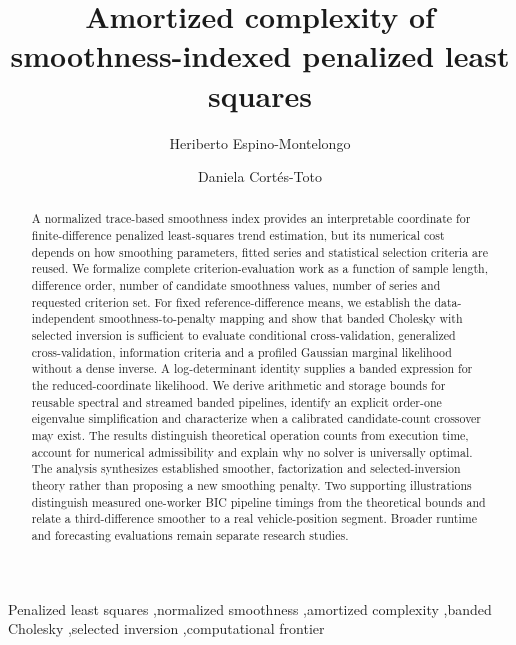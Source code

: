 \documentclass[a4paper,fleqn]{cas-dc}
\begin{document}
\let\WriteBookmarks\relax
\def\floatpagepagefraction{1}
\def\textpagefraction{.001}
\title[mode=title]{Amortized complexity of smoothness-indexed penalized least squares}
\author[1]{Heriberto Espino-Montelongo}
\author[1]{Daniela Cort\'es-Toto}
\begin{abstract}
A normalized trace-based smoothness index provides an interpretable coordinate for finite-difference penalized least-squares trend estimation, but its numerical cost depends on how smoothing parameters, fitted series and statistical selection criteria are reused. We formalize complete criterion-evaluation work as a function of sample length, difference order, number of candidate smoothness values, number of series and requested criterion set. For fixed reference-difference means, we establish the data-independent smoothness-to-penalty mapping and show that banded Cholesky with selected inversion is sufficient to evaluate conditional cross-validation, generalized cross-validation, information criteria and a profiled Gaussian marginal likelihood without a dense inverse. A log-determinant identity supplies a banded expression for the reduced-coordinate likelihood. We derive arithmetic and storage bounds for reusable spectral and streamed banded pipelines, identify an explicit order-one eigenvalue simplification and characterize when a calibrated candidate-count crossover may exist. The results distinguish theoretical operation counts from execution time, account for numerical admissibility and explain why no solver is universally optimal. The analysis synthesizes established smoother, factorization and selected-inversion theory rather than proposing a new smoothing penalty. Two supporting illustrations distinguish measured one-worker BIC pipeline timings from the theoretical bounds and relate a third-difference smoother to a real vehicle-position segment. Broader runtime and forecasting evaluations remain separate research studies.
\end{abstract}
\begin{keywords}
Penalized least squares \sep normalized smoothness \sep amortized complexity
\sep banded Cholesky \sep selected inversion \sep computational frontier
\end{keywords}
\maketitle










\end{document}
